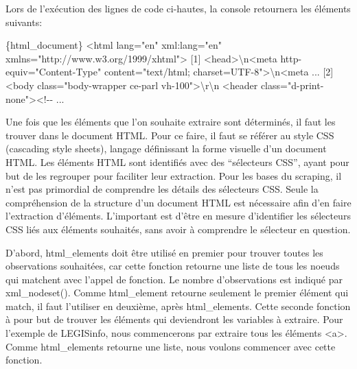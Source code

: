 \documentclass[
  letterpaper,
  DIV=11,
  numbers=noendperiod]{scrreprt}
\newenvironment{Shaded}{\begin{snugshade}}{\end{snugshade}}
\newcommand{\DataTypeTok}[1]{\textcolor[rgb]{0.68,0.00,0.00}{#1}}
\newcommand{\ExtensionTok}[1]{\textcolor[rgb]{0.00,0.23,0.31}{#1}}
\newcommand{\NormalTok}[1]{\textcolor[rgb]{0.00,0.23,0.31}{#1}}
\newcommand{\OperatorTok}[1]{\textcolor[rgb]{0.37,0.37,0.37}{#1}}
\newcommand{\StringTok}[1]{\textcolor[rgb]{0.13,0.47,0.30}{#1}}
\newcommand{\VariableTok}[1]{\textcolor[rgb]{0.07,0.07,0.07}{#1}}
\begin{document}
Lors de l'exécution des lignes de code ci-hautes, la console retournera
les éléments suivants:

\begin{Shaded}
\begin{Highlighting}[]
\ExtensionTok{\{html\_document\}}
\OperatorTok{\textless{}}\NormalTok{html }\VariableTok{lang}\OperatorTok{=}\StringTok{"en"} \ExtensionTok{xml:lang=}\StringTok{"en"}\NormalTok{ xmlns=}\StringTok{"http://www.w3.org/1999/xhtml"}\OperatorTok{\textgreater{}}
\ExtensionTok{[1]} \OperatorTok{\textless{}}\NormalTok{head}\OperatorTok{\textgreater{}}\DataTypeTok{\textbackslash{}n}\OperatorTok{\textless{}}\NormalTok{meta http{-}equiv=}\StringTok{"Content{-}Type"} 
\VariableTok{content}\OperatorTok{=}\StringTok{"text/html; charset=UTF{-}8"}\OperatorTok{\textgreater{}}\DataTypeTok{\textbackslash{}n}\OperatorTok{\textless{}}\NormalTok{meta }
\ExtensionTok{...}
\ExtensionTok{[2]} \OperatorTok{\textless{}}\NormalTok{body class=}\StringTok{"body{-}wrapper ce{-}parl vh{-}100"}\OperatorTok{\textgreater{}}\DataTypeTok{\textbackslash{}r\textbackslash{}n}    
\OperatorTok{\textless{}}\NormalTok{header }\VariableTok{class}\OperatorTok{=}\StringTok{"d{-}print{-}none"}\OperatorTok{\textgreater{}\textless{}}\NormalTok{!{-}{-} }\ExtensionTok{...}
\end{Highlighting}
\end{Shaded}

Une fois que les éléments que l'on souhaite extraire sont déterminés, il
faut les trouver dans le document HTML. Pour ce faire, il faut se
référer au style CSS (cascading style sheets), langage définissant la
forme visuelle d'un document HTML. Les éléments HTML sont identifiés
avec des ``sélecteurs CSS'', ayant pour but de les regrouper pour
faciliter leur extraction. Pour les bases du scraping, il n'est pas
primordial de comprendre les détails des sélecteurs CSS. Seule la
compréhension de la structure d'un document HTML est nécessaire afin
d'en faire l'extraction d'éléments. L'important est d'être en mesure
d'identifier les sélecteurs CSS liés aux éléments souhaités, sans avoir
à comprendre le sélecteur en question.

D'abord, html\_elements doit être utilisé en premier pour trouver toutes
les observations souhaitées, car cette fonction retourne une liste de
tous les noeuds qui matchent avec l'appel de fonction. Le nombre
d'observations est indiqué par xml\_nodeset(). Comme html\_element
retourne seulement le premier élément qui match, il faut l'utiliser en
deuxième, après html\_elements. Cette seconde fonction à pour but de
trouver les éléments qui deviendront les variables à extraire. Pour
l'exemple de LEGISinfo, nous commencerons par extraire tous les éléments
\textless a\textgreater. Comme html\_elements retourne une liste, nous
voulons commencer avec cette fonction.
\end{document}
